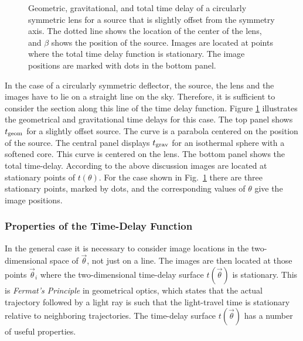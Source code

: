 \documentclass[a4paper,10pt]{article} %
\begin{document}
\begin{figure}[ht] %
\begin{center}
\begin{minipage}[t]{0.6\hsize}
\end{minipage}
\end{center}
\caption{Geometric, gravitational, and total time delay of a
  circularly symmetric lens for a source that is slightly offset from
  the symmetry axis. The dotted line shows the location of the center
  of the lens, and $\beta$ shows the position of the source. Images
  are located at points where the total time delay function is
  stationary. The image positions are marked with dots in the bottom
  panel.}
\label{NB:fig3.2}
\end{figure}

In the case of a circularly symmetric deflector, the source, the lens
and the images have to lie on a straight line on the sky. Therefore,
it is sufficient to consider the section along this line of the time
delay function. Figure \ref{NB:fig3.2} illustrates the geometrical and
gravitational time delays for this case. The top panel shows $t_{\rm
geom}$ for a slightly offset source. The curve is a parabola centered
on the position of the source. The central panel displays $t_{\rm
grav}$ for an isothermal sphere with a softened core. This curve is
centered on the lens. The bottom panel shows the total
time-delay. According to the above discussion images are located at
stationary points of $t(\theta)$. For the case shown in Fig.\
\ref{NB:fig3.2} there are three stationary points, marked by dots, and
the corresponding values of $\theta$ give the image positions.

\subsubsection{Properties of the Time-Delay Function}
\label{NB:subsubsect3.3.2}

In the general case it is necessary to consider image locations in the
two-dimensional space of $\vec\theta$, not just on a line. The images
are then located at those points $\vec\theta_i$ where the
two-dimensional time-delay surface $t(\vec\theta)$ is stationary.
This is {\em Fermat's Principle\/} in geometrical optics, which states
that the actual trajectory followed by a light ray is such that the
light-travel time is stationary relative to neighboring trajectories.
The time-delay surface $t(\vec\theta)$ has a number of useful
properties.
\end{document}
